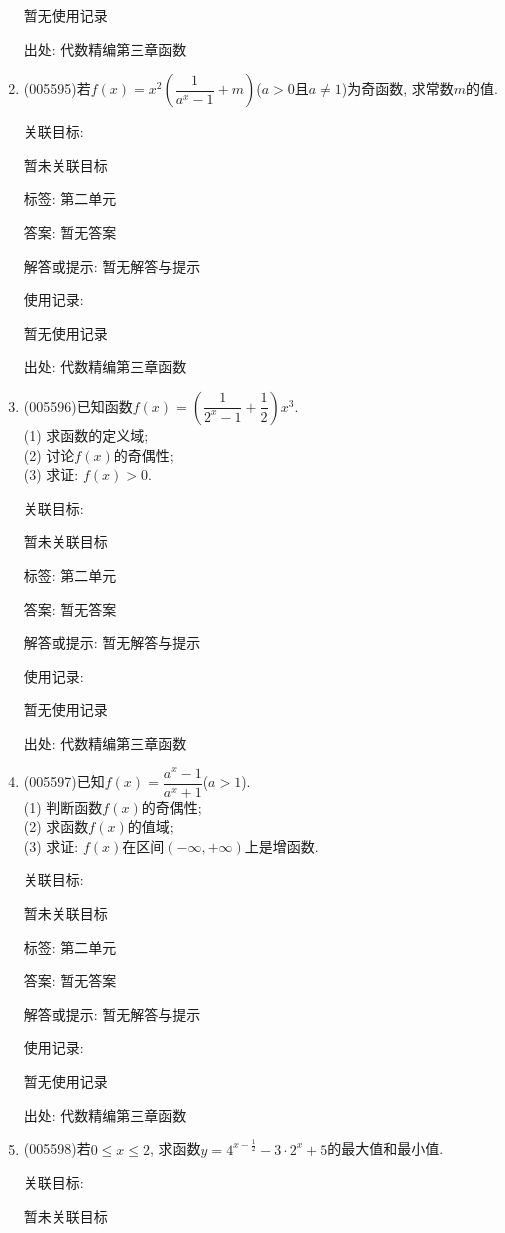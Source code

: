 \documentclass[10pt,a4paper]{article}
\begin{document}
\begin{enumerate}[1.]
暂无使用记录


出处: 代数精编第三章函数
\item { (005595)}若$f(x)=x^2(\dfrac 1{a^x-1}+m)$($a>0$且$a\ne 1$)为奇函数, 求常数$m$的值.


关联目标:

暂未关联目标



标签: 第二单元

答案: 暂无答案

解答或提示: 暂无解答与提示

使用记录:

暂无使用记录


出处: 代数精编第三章函数
\item { (005596)}已知函数$f(x)=(\dfrac 1{2^x-1}+\dfrac 12)x^3$.\\
(1) 求函数的定义域;\\
(2) 讨论$f(x)$的奇偶性;\\
(3) 求证: $f(x)>0$.


关联目标:

暂未关联目标



标签: 第二单元

答案: 暂无答案

解答或提示: 暂无解答与提示

使用记录:

暂无使用记录


出处: 代数精编第三章函数
\item { (005597)}已知$f(x)=\dfrac{a^x-1}{a^x+1}$($a>1$).\\
(1) 判断函数$f(x)$的奇偶性;\\
(2) 求函数$f(x)$的值域;\\
(3) 求证: $f(x)$在区间$(-\infty ,+\infty)$上是增函数.


关联目标:

暂未关联目标



标签: 第二单元

答案: 暂无答案

解答或提示: 暂无解答与提示

使用记录:

暂无使用记录


出处: 代数精编第三章函数
\item { (005598)}若$0\le x\le 2$, 求函数$y=4^{x-\frac 12}-3\cdot 2^x+5$的最大值和最小值.


关联目标:

暂未关联目标




\end{enumerate}
\end{document}
